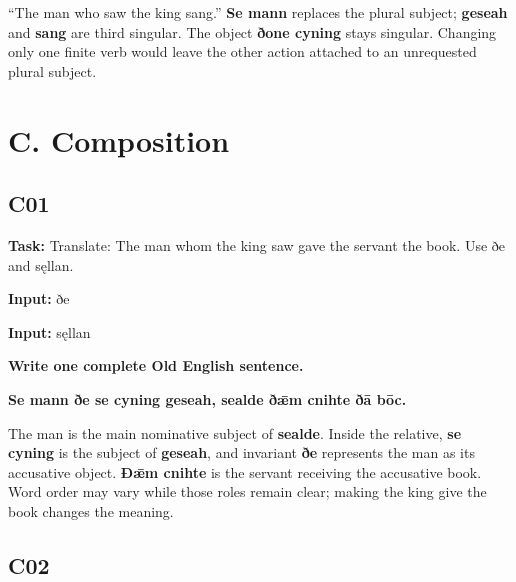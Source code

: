 “The man who saw the king sang.” \textbf{Se mann} replaces the plural subject; \textbf{geseah} and \textbf{sang} are third singular. The object \textbf{ðone cyning} stays singular. Changing only one finite verb would leave the other action attached to an unrequested plural subject.

\clearpage
\section*{C. Composition}

\subsection*{C01}

\textbf{Task:} Translate: The man whom the king saw gave the servant the book. Use ðe and sęllan.

\textbf{Input:} ðe

\textbf{Input:} sęllan

\par\begin{minipage}{\linewidth}\raggedright
\textbf{Write one complete Old English sentence.}

\textbf{Se mann ðe se cyning geseah, sealde ðǣm cnihte ðā bōc.}
\end{minipage}\par

The man is the main nominative subject of \textbf{sealde}. Inside the relative, \textbf{se cyning} is the subject of \textbf{geseah}, and invariant \textbf{ðe} represents the man as its accusative object. \textbf{Ðǣm cnihte} is the servant receiving the accusative book. Word order may vary while those roles remain clear; making the king give the book changes the meaning.

\subsection*{C02}

